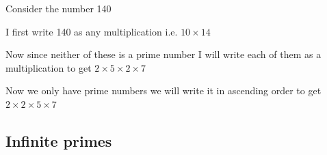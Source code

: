 \begin{exmp}
  Consider the number 140

  I first write 140 as any multiplication i.e. $10 \times 14$

  Now since neither of these is a prime number I will write each of them as a multiplication to get $2 \times 5\times 2 \times 7$

  Now we only have prime numbers we will write it in ascending order to get $2 \times 2 \times 5 \times 7$
\end{exmp}


\subsection{Infinite primes}
